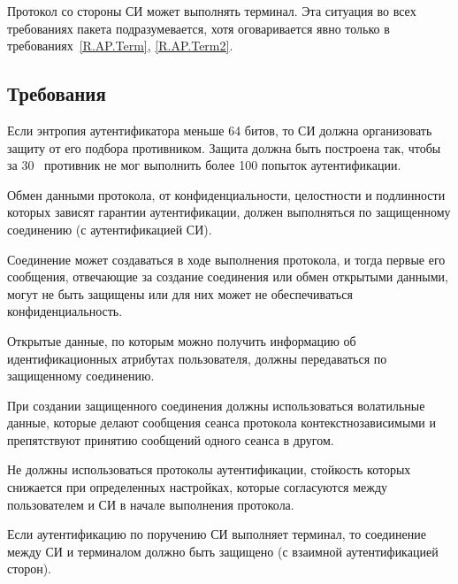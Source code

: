 Протокол со стороны СИ может выполнять терминал. Эта ситуация во всех  
требованиях пакета подразумевается, хотя оговаривается явно только в 
требованиях~\ref{R.AP.Term}, \ref{R.AP.Term2}. 

\subsection{Требования}\label{AP.Reqs}

\label{Req.AP.Attempts}
Если энтропия аутентификатора меньше 64 битов, то СИ должна организовать защиту 
от его подбора противником. Защита должна быть построена так, чтобы за 
30~ противник не мог выполнить более 100 попыток 
аутентификации.

Обмен данными протокола, от конфиденциальности, целостности и подлинности 
которых зависят гарантии аутентификации, должен выполняться по защищенному 
соединению (с аутентификацией СИ).

\begin{note*}
Соединение может создаваться в ходе выполнения протокола, и тогда
первые его сообщения, отвечающие за создание соединения или обмен открытыми 
данными, могут не быть защищены или для них может не обеспечиваться 
конфиденциальность.
\end{note*}


Открытые данные, по которым можно получить информацию об идентификационных 
атрибутах пользователя, должны передаваться по защищенному соединению.


При создании защищенного соединения должны использоваться волатильные данные,
которые делают сообщения сеанса протокола контекстнозависимыми и препятствуют 
принятию сообщений одного сеанса в другом.


Не должны использоваться протоколы аутентификации, стойкость
которых снижается при определенных настройках, которые согласуются между
пользователем и СИ в начале выполнения протокола.


\label{R.AP.Term}
Если аутентификацию по поручению СИ выполняет  терминал, то 
соединение между СИ и терминалом должно быть защищено (с взаимной 
аутентификацией сторон).

